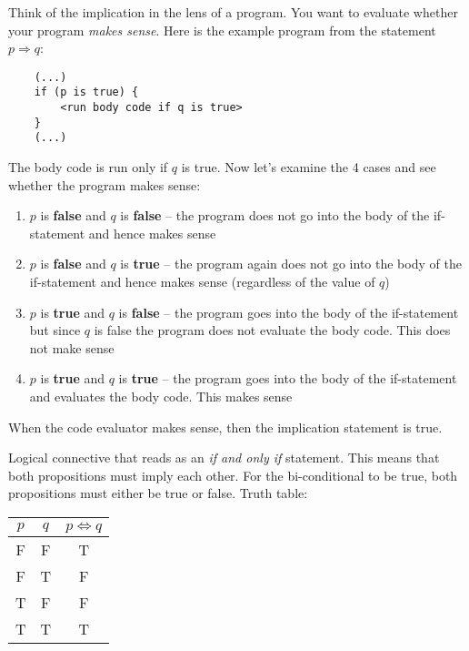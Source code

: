 \documentclass[main.tex]{subfiles}
\begin{document}
\begin{example}
	Think of the implication in the lens of a program. You want to evaluate whether your program \textit{makes sense}. Here is the example program from the statement \(p \Rightarrow q\):
	
	\begin{lstlisting}
	(...)
	if (p is true) {
		<run body code if q is true>
	}
	(...)
	\end{lstlisting}
	
	The body code is run only if \(q\) is true. Now let's examine the 4 cases and see whether the program makes sense:
	\begin{enumerate}
		\item \(p\) is \textbf{false} and \(q\) is \textbf{false} -- the program does not go into the body of the if-statement and hence makes sense
		\item \(p\) is \textbf{false} and \(q\) is \textbf{true} -- the program again does not go into the body of the if-statement and hence makes sense (regardless of the value of \(q\))
		\item \(p\) is \textbf{true} and \(q\) is \textbf{false} -- the program goes into the body of the if-statement but since \(q\) is false the program does not evaluate the body code. This does not make sense
		\item \(p\) is \textbf{true} and \(q\) is \textbf{true} -- the program goes into the body of the if-statement and evaluates the body code. This makes sense
	\end{enumerate}
	
	When the code evaluator makes sense, then the implication statement is true.
\end{example}


\begin{defn}
	Logical connective that reads as an \textit{if and only if} statement. This means that both propositions must imply each other. For the bi-conditional to be true, both propositions must either be true or false. Truth table:
	\begin{center}
		\begin{tabular}{c|c|c}
			\(p\) & \(q\) & \(p \Leftrightarrow q\) \\
			\hline
			F & F & T \\
			F & T & F \\
			T & F & F \\
			T & T & T
		\end{tabular}
	\end{center}
\end{defn}
\end{document}
